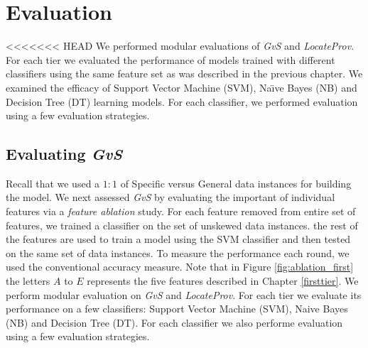 \chapter{Evaluation}
\label{evaluation}
<<<<<<< HEAD
We performed modular evaluations of {\it GvS} and {\it LocateProv}. For each tier we evaluated the performance of models trained with different classifiers using the same feature set as was described in the previous chapter.  We examined the efficacy of Support Vector Machine (SVM), Na\"{\i}ve Bayes (NB) and Decision Tree (DT) learning models. 
For each classifier, we performed evaluation using a few evaluation strategies.

\section{Evaluating {\it GvS}}
\label{eval:first}
Recall that we used a $1:1$ of Specific versus General data instances for building the model.  
We next assessed {\it GvS} by evaluating the important of individual features via a {\it feature ablation} study. For each feature removed from entire set of features, we trained a classifier on the set of unskewed data instances. the rest of the features are used to train a model using the SVM classifier and then tested on the same set of data instances. To measure the performance each round, we used the conventional accuracy measure. Note that in Figure \ref{fig:ablation_first} the letters $A$ to $E$ represents the five features described in Chapter \ref{firsttier}.
We perform modular evaluation on \textit{GvS} and \textit{LocateProv}. For each tier we evaluate its performance on a few classifiers: Support Vector Machine (SVM), Naive Bayes (NB) and Decision Tree (DT). For each classifier we also performe evaluation using a few evaluation strategies.



